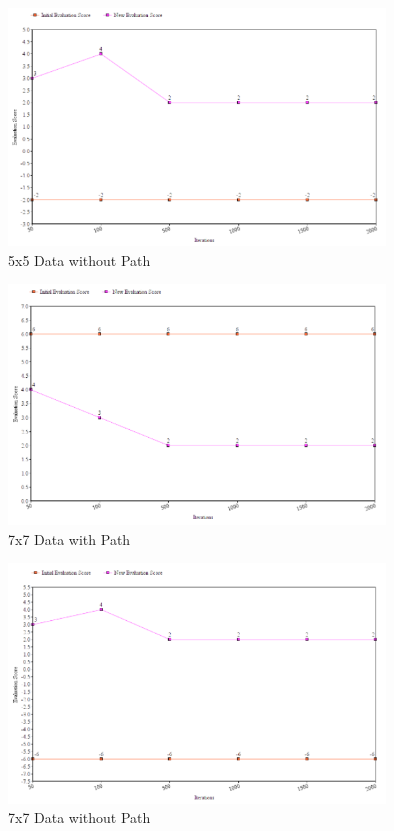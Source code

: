 \documentclass[11pt, oneside]{article}   	%
\begin{document}
\begin{figure}[H]
\centering
\includegraphics[width=100mm]{5x5noPath.png}
\caption{5x5 Data without Path}
\label{fig:method}
\end{figure}
\begin{figure}[H]
\centering
\includegraphics[width=100mm]{7x7Path.png}
\caption{7x7 Data with Path}
\label{fig:method}
\end{figure}

\begin{figure}[H]
\centering
\includegraphics[width=100mm]{7x7noPath.png}
\caption{7x7 Data without Path}
\label{fig:method}
\end{figure}
\end{document}
